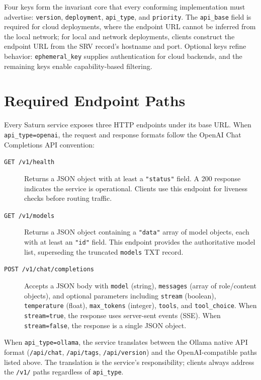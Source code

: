 Four keys form the invariant core that every conforming implementation must advertise: \texttt{version}, \texttt{deployment}, \texttt{api\_type}, and \texttt{priority}. The \texttt{api\_base} field is required for cloud deployments, where the endpoint URL cannot be inferred from the local network; for local and network deployments, clients construct the endpoint URL from the SRV record's hostname and port. Optional keys refine behavior: \texttt{ephemeral\_key} supplies authentication for cloud backends, and the remaining keys enable capability-based filtering.

\section{Required Endpoint Paths}
\label{app:endpoints}

Every Saturn service exposes three HTTP endpoints under its base URL. When \texttt{api\_type=openai}, the request and response formats follow the OpenAI Chat Completions API convention:

\begin{description}
  \item[\texttt{GET /v1/health}] Returns a JSON object with at least a \texttt{"status"} field. A 200 response indicates the service is operational. Clients use this endpoint for liveness checks before routing traffic.

  \item[\texttt{GET /v1/models}] Returns a JSON object containing a \texttt{"data"} array of model objects, each with at least an \texttt{"id"} field. This endpoint provides the authoritative model list, superseding the truncated \texttt{models} TXT record.

  \item[\texttt{POST /v1/chat/completions}] Accepts a JSON body with \texttt{model} (string), \texttt{messages} (array of role/content objects), and optional parameters including \texttt{stream} (boolean), \texttt{temperature} (float), \texttt{max\_tokens} (integer), \texttt{tools}, and \texttt{tool\_choice}. When \texttt{stream=true}, the response uses server-sent events (SSE). When \texttt{stream=false}, the response is a single JSON object.
\end{description}

When \texttt{api\_type=ollama}, the service translates between the Ollama native API format (\texttt{/api/chat}, \texttt{/api/tags}, \texttt{/api/version}) and the OpenAI-compatible paths listed above. The translation is the service's responsibility; clients always address the \texttt{/v1/} paths regardless of \texttt{api\_type}.

